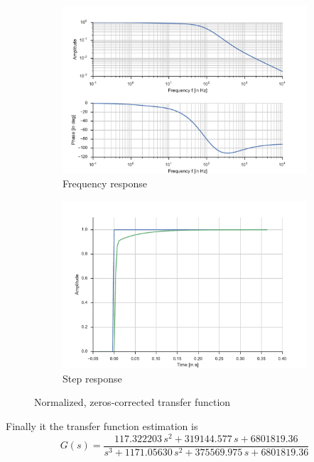 \begin{figure}
	\begin{subfigure}[t]{0.5\linewidth}
		\includegraphics[width=1\linewidth]{img/ctl_id_2z}
		\caption{Frequency response}
	\end{subfigure}
	\hfill
	\begin{subfigure}[t]{0.5\linewidth}
		\includegraphics[width=1\linewidth]{img/ctl_id_2z_step}
		\caption{Step response}
	\end{subfigure}
	\caption{\label{fig:ctl_id_nospike}Normalized, zeros-corrected transfer function}
\end{figure}

Finally it the transfer function estimation is 
\begin{equation}
G(s) = \frac{117.322203 \,s^2 + 319144.577 \,s + 6801819.36}
{s^3 + 1171.05630 \,s^2 + 375569.975 \,s +	6801819.36}
\end{equation}

